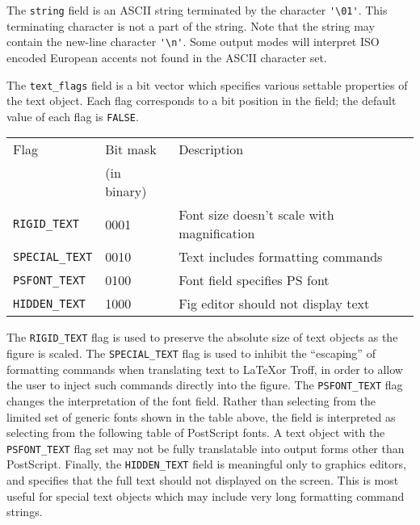 The {\tt string} field is an ASCII string terminated by the character
	\verb|'\01'|.
This terminating character is not a part of the	string.
Note that the string may contain the new-line character \verb|'\n'|.
Some output modes will interpret ISO encoded European accents
	not found in the ASCII character set.

The {\tt text\_flags} field is a bit vector which specifies various
	settable properties of the text object.
Each flag corresponds to a bit position in the field; the default value
	of each flag is {\tt FALSE}.

\begin{center}
\begin{tabular}{|l|l|l|}
\hline
Flag			& Bit mask	& Description		\\
			& (in binary)	&			\\ \hline
\hline
%
{\tt RIGID\_TEXT}	& 0001 	&
			Font size doesn't scale with magnification\\ \hline
%
{\tt SPECIAL\_TEXT}	& 0010	&  Text includes formatting commands \\ \hline
%
{\tt PSFONT\_TEXT}	& 0100	&  Font field specifies PS font	\\ \hline
%
{\tt HIDDEN\_TEXT}	& 1000	&  Fig editor should not display text \\ \hline
\end{tabular}
\end{center}

The {\tt RIGID\_TEXT} flag is used to preserve the absolute size of text
	objects as the figure is scaled.
The {\tt SPECIAL\_TEXT} flag is used to inhibit the ``escaping'' of formatting
	commands when translating text to \LaTeX or Troff, in order to allow
	the user to inject such commands directly into the figure.
The {\tt PSFONT\_TEXT} flag changes the interpretation of the font
	field.
Rather than selecting from the limited set of generic fonts shown in the table
	above, the field is interpreted as selecting from the following table
	of PostScript fonts.
A text object with the {\tt PSFONT\_TEXT} flag set may not be fully 
	translatable into output forms other than PostScript.
Finally, the {\tt HIDDEN\_TEXT} field is meaningful only to graphics editors,
	and specifies that the full text should not displayed on the screen.
This is most useful for special text objects which may include very long
	formatting command strings.

